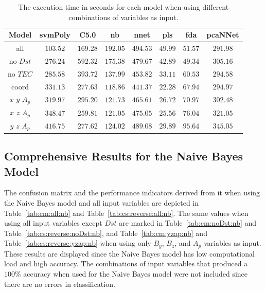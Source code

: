 \documentclass[sn-mathphys-num]{sn-jnl}%
\begin{document}
\begin{table}[!ht]
    \centering
    \caption{The execution time in seconds for each model when using different combinations of variables as input.}
	\label{tab:time:total}
	\begin{tabular}{|c|c|c|c|c|c|c|c|}
		\hline
		Model & svmPoly & C5.0 & nb & nnet & pls & fda & pcaNNet \\ \hline
		all & $103.52$ & $169.28$ & $192.05$ & $494.53$ & $49.99$ & $51.57$ & $291.98$ \\ \hline
		no $Dst$ & $276.24$ & $592.32$ & $175.38$ & $479.67$ & $42.89$ & $49.34$ & $305.16$ \\ \hline
		no $TEC$ & $285.58$ & $393.72$ & $137.99$ & $453.82$ & $33.11$ & $60.53$ & $294.58$ \\ \hline
		coord & $331.13$ & $277.63$ & $118.86$ & $441.37$ & $22.28$ & $67.94$ & $294.97$ \\ \hline
		$x$ $y$ $A_{p}$ & $319.97$ & $295.20$ & $121.73$ & $465.61$ & $26.72$ & $70.97$ & $302.48$ \\ \hline
		$x$ $z$ $A_{p}$ & $348.47$ & $259.81$ & $121.05$ & $475.05$ & $25.56$ & $76.04$ & $321.05$ \\ \hline
		$y$ $z$ $A_{p}$ & $416.75$ & $277.62$ & $124.02$ & $489.08$ & $29.89$ & $95.64$ & $345.05$ \\ \hline
	\end{tabular}
\end{table}

\subsection{Comprehensive Results for the Naive Bayes Model}

The confusion matrix and the performance indicators derived from it when using the Naive Bayes model and all input variables are depicted in Table~\ref{tab:cm:all:nb} and Table~\ref{tab:cs:reverse:all:nb}. The same values when using all input variables except $Dst$ are marked in Table~\ref{tab:cm:noDst:nb} and Table~\ref{tab:cs:reverse:noDst:nb}, and Table~\ref{tab:cm:yzap:nb} and Table~\ref{tab:cs:reverse:yzap:nb} when using only $B_{y}$, $B_{z}$, and $A_{p}$ variables as input. These results are displayed since the Naive Bayes model has low computational load and high accuracy. The combinations of input variables that produced a $100\%$ accuracy when used for the Naive Bayes model were not included since there are no errors in classification.
\end{document}
